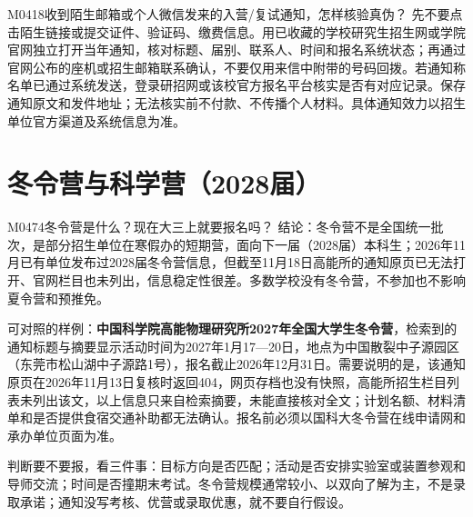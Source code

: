 
\begin{qa}{M0418}{收到陌生邮箱或个人微信发来的入营/复试通知，怎样核验真伪？}
先不要点击陌生链接或提交证件、验证码、缴费信息。用已收藏的学校研究生招生网或学院官网独立打开当年通知，核对标题、届别、联系人、时间和报名系统状态；再通过官网公布的座机或招生邮箱联系确认，不要仅用来信中附带的号码回拨。若通知称名单已通过系统发送，登录研招网或该校官方报名平台核实是否有对应记录。保存通知原文和发件地址；无法核实前不付款、不传播个人材料。具体通知效力以招生单位官方渠道及系统信息为准。
\end{qa}

\section{冬令营与科学营（2028届）}

\begin{qa}{M0474}{冬令营是什么？现在大三上就要报名吗？}
结论：冬令营不是全国统一批次，是部分招生单位在寒假办的短期营，面向下一届（2028届）本科生；2026年11月已有单位发布过2028届冬令营信息，但截至11月18日高能所的通知原页已无法打开、官网栏目也未列出，信息稳定性很差。多数学校没有冬令营，不参加也不影响夏令营和预推免。

可对照的样例：\textbf{中国科学院高能物理研究所2027年全国大学生冬令营}，检索到的通知标题与摘要显示活动时间为2027年1月17—20日，地点为中国散裂中子源园区（东莞市松山湖中子源路1号），报名截止2026年12月31日。需要说明的是，该通知原页在2026年11月13日复核时返回404，网页存档也没有快照，高能所招生栏目列表未列出该文，以上信息只来自检索摘要，未能直接核对全文；计划名额、材料清单和是否提供食宿交通补助都无法确认。报名前必须以国科大冬令营在线申请网和承办单位页面为准。

判断要不要报，看三件事：目标方向是否匹配；活动是否安排实验室或装置参观和导师交流；时间是否撞期末考试。冬令营规模通常较小、以双向了解为主，不是录取承诺；通知没写考核、优营或录取优惠，就不要自行假设。
\end{qa}

